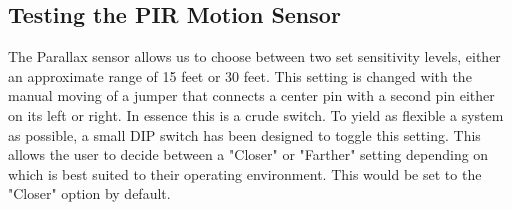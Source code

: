 \subsection{Testing the PIR Motion Sensor}
\par The Parallax sensor allows us to choose between two set sensitivity levels, either an approximate range of 15 feet or 30 feet. This setting is changed with the manual moving of a jumper that connects a center pin with a second pin either on its left or right. In essence this is a crude switch. To yield as flexible a system as possible, a small DIP switch has been designed to toggle this setting. This allows the user to decide between a "Closer" or "Farther" setting depending on which is best suited to their operating environment. This would be set to the "Closer" option by default. 